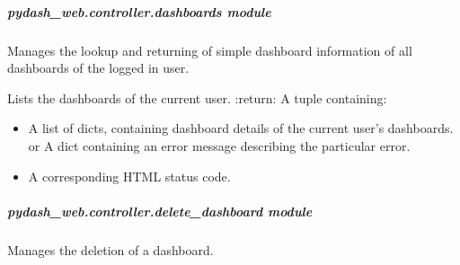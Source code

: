 \documentclass[letterpaper,10pt,english]{sphinxmanual}
\begin{document}

\begin{fulllineitems}
\label{\detokenize{pydash_web.controller.dashboard_statistic:pydash_web.controller.dashboard_statistic.string_to_bool}}
\end{fulllineitems}



\subparagraph{pydash\_web.controller.dashboards module}
\label{\detokenize{pydash_web.controller.dashboards:module-pydash_web.controller.dashboards}}\label{\detokenize{pydash_web.controller.dashboards:pydash-web-controller-dashboards-module}}\label{\detokenize{pydash_web.controller.dashboards::doc}}
Manages the lookup and returning of simple dashboard information of all dashboards of the logged in user.

\begin{fulllineitems}
\label{\detokenize{pydash_web.controller.dashboards:pydash_web.controller.dashboards.dashboards}}
Lists the dashboards of the current user.
:return: A tuple containing:
\begin{itemize}
\item {} 
A list of dicts, containing dashboard details of the current user’s dashboards.
or
A dict containing an error message describing the particular error.

\item {} 
A corresponding HTML status code.

\end{itemize}

\end{fulllineitems}



\subparagraph{pydash\_web.controller.delete\_dashboard module}
\label{\detokenize{pydash_web.controller.delete_dashboard:module-pydash_web.controller.delete_dashboard}}\label{\detokenize{pydash_web.controller.delete_dashboard:pydash-web-controller-delete-dashboard-module}}\label{\detokenize{pydash_web.controller.delete_dashboard::doc}}
Manages the deletion of a dashboard.
\end{document}
